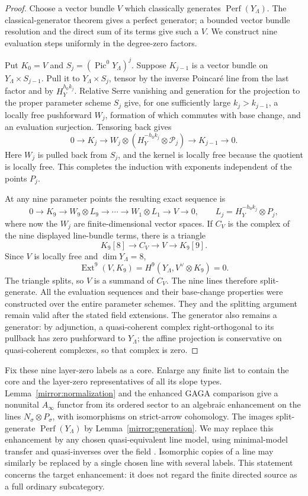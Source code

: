 \documentclass[11pt]{article}
\theoremstyle{definition}
\theoremstyle{remark}
\newcommand{\Ainf}{A_\infty}
\DeclareMathOperator{\Ext}{Ext}
\DeclareMathOperator{\Pic}{Pic}
\DeclareMathOperator{\Perf}{Perf}
\numberwithin{equation}{section}
\begin{document}
\begin{proof}
Choose a vector bundle $V$ which classically generates
$\Perf(Y_\Lambda)$.  The classical-generator theorem
\cite{bondal-vdb} gives a perfect generator; a bounded vector bundle
resolution and the direct sum of its terms give such a $V$.
We construct nine evaluation steps uniformly in the degree-zero
factors.

Put $K_0=V$ and $S_j=(\Pic^0Y_\Lambda)^j$.  Suppose $K_{j-1}$ is
a vector bundle on $Y_\Lambda\times S_{j-1}$.  Pull it to
$Y_\Lambda\times S_j$, tensor by the inverse Poincar\'e line from
the last factor and by $H_Y^{h_0k_j}$.  Relative Serre vanishing and
generation for the projection to the proper parameter scheme $S_j$
give, for one sufficiently large $k_j>k_{j-1}$, a locally free
pushforward $W_j$, formation of which commutes with base change,
and an evaluation surjection.  Tensoring back gives
\[
 0\longrightarrow K_j\longrightarrow
 W_j\otimes(H_Y^{-h_0k_j}\otimes\mathcal P_j)
 \longrightarrow K_{j-1}\longrightarrow0.
\]
Here $W_j$ is pulled back from $S_j$, and the kernel is locally free
because the quotient is locally free.  This completes the induction
with exponents independent of the points $P_j$.

At any nine parameter points the resulting exact sequence is
\[
 0\to K_9\to W_9\otimes L_9\to\cdots\to
 W_1\otimes L_1\to V\to0,
 \qquad L_j=H_Y^{-h_0k_j}\otimes P_j,
\]
where now the $W_j$ are finite-dimensional vector spaces.  If $C_V$
is the complex of the nine displayed line-bundle terms, there is a
triangle
\[
 K_9[8]\longrightarrow C_V\longrightarrow V
       \longrightarrow K_9[9].
\]
Since $V$ is locally free and $\dim Y_\Lambda=8$,
\[
 \Ext^9(V,K_9)=H^9(Y_\Lambda,V^\vee\otimes K_9)=0.
\]
The triangle splits, so $V$ is a summand of $C_V$.  The nine lines
therefore split-generate.  All the evaluation sequences and their
base-change properties were constructed over the entire parameter
schemes.  They and the splitting argument remain valid after the
stated field extensions.  The generator also remains a generator:
by adjunction, a quasi-coherent complex right-orthogonal to its
pullback has zero pushforward to $Y_\Lambda$; the affine projection
is conservative on quasi-coherent complexes, so that complex is zero.
\end{proof}

Fix these nine layer-zero labels as a core.  Enlarge any finite list
to contain the core and the layer-zero representatives of all its
slope types.  Lemma~\ref{mirror:normalization} and the enhanced GAGA
comparison give a nonunital $\Ainf$ functor from its ordered sector
to an algebraic enhancement on the lines
$N_\sigma\otimes P_\sigma$, with isomorphisms on strict-arrow
cohomology.  The images split-generate $\Perf(Y_\Lambda)$ by
Lemma~\ref{mirror:generation}.  We may replace this enhancement by
any chosen quasi-equivalent line model, using minimal-model transfer
and quasi-inverses over the field \cite{seidel}.  Isomorphic copies
of a line may similarly be replaced by a single chosen line with
several labels.  This statement concerns the target enhancement:
it does not regard the finite directed source as a full ordinary
subcategory.
\end{document}
